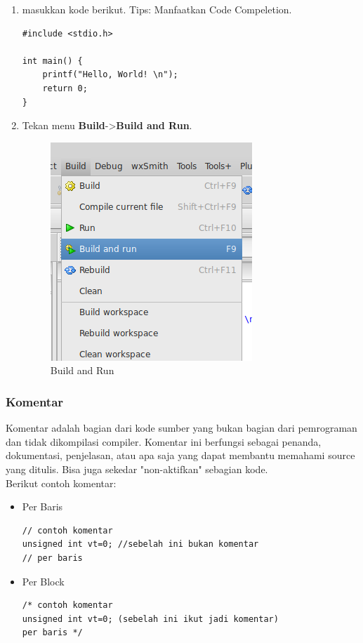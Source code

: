 \documentclass[12pt,]{article}
\begin{document}
\begin{enumerate}
		\item masukkan kode berikut.
		Tips: Manfaatkan Code Compeletion.
		\begin{verbatim}
#include <stdio.h>

int main() {
	printf("Hello, World! \n");
	return 0;
}
		\end{verbatim}
		\item Tekan menu \textbf{Build}->\textbf{Build and Run}.
		\begin{figure}[H]
			\centering
			\includegraphics[width=0.4\linewidth]{images/c_cb_10}
			\caption{Build and Run}
		\end{figure}

	\end{enumerate}

	\subsubsection{Komentar}
	Komentar adalah bagian dari kode sumber yang bukan bagian dari pemrograman dan tidak dikompilasi compiler.
	Komentar ini berfungsi sebagai penanda, dokumentasi, penjelasan, atau apa saja yang dapat membantu memahami source yang ditulis.
	Bisa juga sekedar "non-aktifkan" sebagian kode.\\
	Berikut contoh komentar:
	\begin{itemize}
		\item Per Baris
		\begin{verbatim}
// contoh komentar
unsigned int vt=0; //sebelah ini bukan komentar
// per baris
		\end{verbatim}

		\item Per Block
		\begin{verbatim}
/* contoh komentar
unsigned int vt=0; (sebelah ini ikut jadi komentar)
per baris */
		\end{verbatim}
	\end{itemize}
\end{document}
